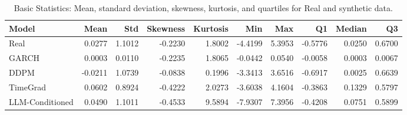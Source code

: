 \begin{table}[htbp]
\centering
\begin{tabular}{lrrrrrrrrr}
\toprule
Model & Mean & Std & Skewness & Kurtosis & Min & Max & Q1 & Median & Q3 \\
\midrule
Real & 0.0277 & 1.1012 & -0.2230 & 1.8002 & -4.4199 & 5.3953 & -0.5776 & 0.0250 & 0.6700 \\
GARCH & 0.0003 & 0.0110 & -0.2235 & 1.8065 & -0.0442 & 0.0540 & -0.0058 & 0.0003 & 0.0067 \\
DDPM & -0.0211 & 1.0739 & -0.0838 & 0.1996 & -3.3413 & 3.6516 & -0.6917 & 0.0025 & 0.6639 \\
TimeGrad & 0.0602 & 0.8924 & -0.4222 & 2.0273 & -3.6038 & 4.1604 & -0.3863 & 0.1329 & 0.5797 \\
LLM-Conditioned & 0.0490 & 1.1011 & -0.4533 & 9.5894 & -7.9307 & 7.3956 & -0.4208 & 0.0751 & 0.5899 \\
\bottomrule
\end{tabular}
\caption{Basic Statistics: Mean, standard deviation, skewness, kurtosis, and quartiles for Real and synthetic data.}
\label{tab:basic_stats}
\end{table}